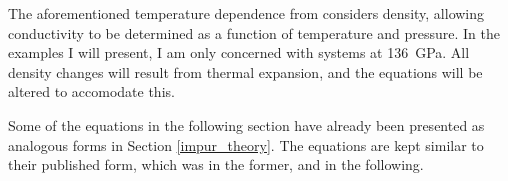 The aforementioned temperature dependence from \citet{Manthilake2011} considers density, allowing conductivity to be determined as a function of temperature and pressure. In the examples I will present, I am only concerned with systems at 136~GPa. All density changes will result from thermal expansion, and the equations will be altered to accomodate this.

Some of the equations in the following section have already been presented as analogous forms in Section \ref{impur_theory}. The equations are kept similar to their published form, which was \citet{Stackhouse2015} in the former, and \citet{Ohta2017, Okuda2017} in the following.

%    
%
%
%
